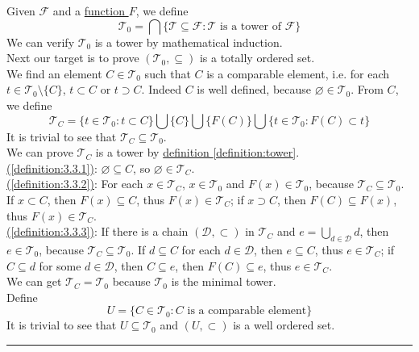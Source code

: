 \documentclass[12pt]{article}
\numberwithin{equation}{section}
\theoremstyle{plain} %
\theoremstyle{definition}
\theoremstyle{remark}
\newenvironment{proof}{{\bf Proof:}}{\hfill\rule{2mm}{2mm}}
\begin{document}
\begin{proof}
Given $\mathcal{F}$ and a \hyperref[definition:B_star]{function $F$}, we define 
$$\mathcal{T}_0 = \bigcap \{ \mathcal{T} \subseteq  \mathcal{F}: \mathcal{T} \text{ is a tower of }\mathcal{F}\}$$
We can verify $\mathcal{T}_0$ is a tower by mathematical induction. \\
Next our target is to prove $(\mathcal{T}_0, \subseteq)$ is a totally ordered set.     \\
We find an element $C \in \mathcal{T}_0$ such that $C$ is a comparable element, i.e. for each $t \in \mathcal{T}_0 \setminus \{{C}\}$, $t \subset {C}$ or $t \supset {C}$. Indeed $C$ is well defined, because $\varnothing \in \mathcal{T}_0$. From ${C}$, we define 
$$\mathcal{T}_C = \{ t \in \mathcal{T}_0: t \subset C \} \bigcup \{ C \} \bigcup \{ F(C) \} \bigcup \{ t \in \mathcal{T}_0: F(C) \subset t \}$$
It is trivial to see that $\mathcal{T}_C \subseteq \mathcal{T}_0$. \\
We can prove $\mathcal{T}_C$ is a tower by \hyperref[definition:tower]{definition  \ref*{definition:tower}}.  \\
\hyperref[definition:3.3.1]{(\ref*{definition:3.3.1})}: $\varnothing \subseteq C$, so $\varnothing \in \mathcal{T}_C$. \\  
\hyperref[definition:3.3.2]{(\ref*{definition:3.3.2})}: For each $x \in \mathcal{T}_C$, $x \in \mathcal{T}_0$ and $F(x) \in \mathcal{T}_0$, because $\mathcal{T}_C \subseteq \mathcal{T}_0$. If $x \subset C$, then $F(x) \subseteq C$, thus $F(x) \in \mathcal{T}_C$; if $x \supset C $, then $F(C) \subseteq F(x)$, thus $F(x) \in \mathcal{T}_C$. \\
\hyperref[definition:3.3.3]{(\ref*{definition:3.3.3})}: If there is a chain $(\mathcal{D}, \subset)$ in $\mathcal{T}_C$ and $e = \bigcup_{d \in \mathcal{D}}d $, then $e \in \mathcal{T}_0$, because $\mathcal{T}_C \subseteq \mathcal{T}_0$. If $d \subseteq C$ for each $d \in \mathcal{D}$, then $e \subseteq C$, thus $e \in \mathcal{T}_C$; if $C \subseteq d$ for some $d \in \mathcal{D}$, then $C \subseteq e$, then $F(C) \subseteq e$, thus $e \in \mathcal{T}_C$. \\
We can get $\mathcal{T}_C = \mathcal{T}_0$ because $\mathcal{T}_0$ is the minimal tower.  \\
Define \\
$$U = \{ C \in \mathcal{T}_0: C \text{ is a comparable element}\}$$
It is trivial to see that $U \subseteq \mathcal{T}_0$ and $(U, \subset)$ is a well ordered set. \\

\end{proof}
\end{document}
